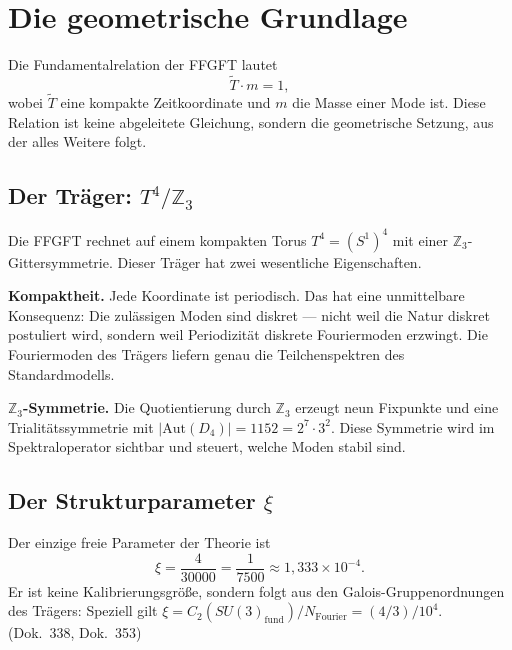 \chapter{Die geometrische Grundlage}
\label{ch:grundlage}

Die Fundamentalrelation der FFGFT lautet
\begin{equation}
  \tilde T \cdot m = 1,
  \label{eq:tm}
\end{equation}
wobei $\tilde T$ eine kompakte Zeitkoordinate und $m$ die Masse einer
Mode ist. Diese Relation ist keine abgeleitete
Gleichung, sondern die geometrische Setzung, aus der alles Weitere
folgt.

\section{Der Träger: $T^4/\mathbb{Z}_3$}

Die FFGFT rechnet auf einem kompakten Torus $T^4 = (S^1)^4$ mit einer
$\mathbb{Z}_3$-Gittersymmetrie. Dieser Träger hat zwei wesentliche
Eigenschaften.

\textbf{Kompaktheit.} Jede Koordinate ist periodisch. Das hat eine
unmittelbare Konsequenz: Die zulässigen Moden sind diskret — nicht weil
die Natur diskret postuliert wird, sondern weil Periodizität
diskrete Fouriermoden erzwingt. Die Fouriermoden des Trägers liefern
genau die Teilchenspektren des Standardmodells.

\textbf{$\mathbb{Z}_3$-Symmetrie.} Die Quotientierung durch
$\mathbb{Z}_3$ erzeugt neun Fixpunkte und eine Trialitätssymmetrie mit
$|\mathrm{Aut}(D_4)| = 1152 = 2^7\cdot3^2$. Diese Symmetrie wird im
Spektraloperator sichtbar und steuert, welche Moden stabil sind.

\section{Der Strukturparameter $\xi$}

Der einzige freie Parameter der Theorie ist
\begin{equation}
  \xi = \frac{4}{30000} = \frac{1}{7500} \approx 1{,}333\times10^{-4}.
\end{equation}
Er ist keine Kalibrierungsgröße, sondern folgt aus den
Galois-Gruppenordnungen des Trägers: Speziell gilt
$\xi = C_2(SU(3)_{\mathrm{fund}})/N_{\mathrm{Fourier}}= (4/3)/10^4$.
(Dok.~338, Dok.~353)

